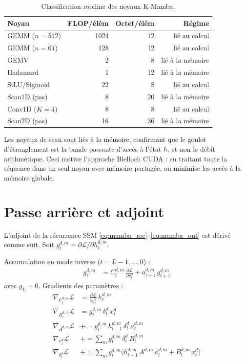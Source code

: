 \documentclass[10pt,onecolumn]{article}
\begin{document}
\begin{table}[htbp]
\centering
\caption{Classification roofline des noyaux K-Mamba.}
\label{tab:roofline}
\begin{tabular}{lrrr}
\toprule
Noyau & FLOP/élém & Octet/élém & Régime \\
\midrule
GEMM ($n{=}512$) & 1024 & 12 & lié au calcul \\
GEMM ($n{=}64$)  & 128  & 12 & lié au calcul \\
GEMV             & 2    & 8  & lié à la mémoire \\
Hadamard         & 1    & 12 & lié à la mémoire \\
SiLU/Sigmoid     & 22   & 8  & lié au calcul \\
Scan1D (pas)     & 8    & 20 & lié à la mémoire \\
Conv1D ($K{=}4$) & 8    & 8  & lié au calcul \\
Scan2D (pas)     & 16   & 36 & lié à la mémoire \\
\bottomrule
\end{tabular}
\end{table}

Les noyaux de scan sont liés à la mémoire, confirmant que le goulot
d'étranglement est la bande passante d'accès à l'état $h$, et non le débit
arithmétique. Ceci motive l'approche Blelloch CUDA : en traitant toute la
séquence dans un seul noyau avec mémoire partagée, on minimise les accès
à la mémoire globale.

\section{Passe arrière et adjoint}
\label{sec:backward}

L'adjoint de la récurrence SSM \eqref{eq:mamba_rec}--\eqref{eq:mamba_out}
est dérivé comme suit. Soit $g_t^{d,m} = \partial \mathcal{L}/\partial h_t^{d,m}$.

Accumulation en mode inverse ($t = L{-}1, \ldots, 0$) :
\begin{align}
  g_t^{d,m} &= C_t^{d,m}\,\frac{\partial\mathcal{L}}{\partial y_t^d}
             + a_{t+1}^{d,m}\,g_{t+1}^{d,m} \label{eq:adjoint_g}
\end{align}
avec $g_L = 0$. Gradients des paramètres :
\begin{align}
  \nabla_{C_t^{d,m}}\mathcal{L} &= \frac{\partial\mathcal{L}}{\partial y_t^d}\,h_t^{d,m} \\
  \nabla_{B_t^{d,m}}\mathcal{L} &= g_t^{d,m}\,\delta_t^d\,x_t^d \\
  \nabla_{A^{d,m}}\mathcal{L}   &+= g_t^{d,m}\,h_{t-1}^{d,m}\,\delta_t^d\,a_t^{d,m} \\
  \nabla_{x_t^d}\mathcal{L}     &+= \sum_m g_t^{d,m}\,\delta_t^d\,B_t^{d,m} \\
  \nabla_{\delta_t^d}\mathcal{L} &+= \sum_m g_t^{d,m}
        \bigl(h_{t-1}^{d,m}\,A^{d,m}\,a_t^{d,m} + B_t^{d,m}\,x_t^d\bigr)
\end{align}
\end{document}

